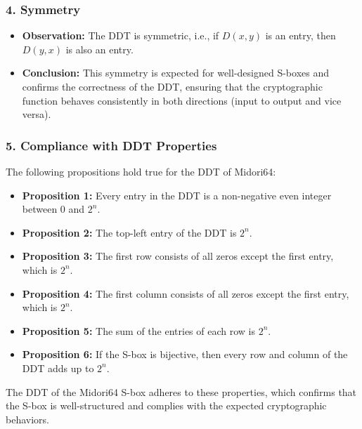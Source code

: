 \subsubsection*{4. Symmetry}
\begin{itemize}
	\item
	      \textbf{Observation:} The DDT is symmetric, i.e., if \( D(x, y) \) is an entry,
	      then \( D(y, x) \) is also an entry.
	\item
	      \textbf{Conclusion:} This symmetry is expected for well-designed S-boxes and
	      confirms the correctness of the DDT, ensuring that the cryptographic function
	      behaves consistently in both directions (input to output and vice versa).
\end{itemize}

\subsubsection*{5. Compliance with DDT Properties}
The following propositions hold true for the DDT of Midori64:
\begin{itemize}
	\item \textbf{Proposition 1:} Every entry in the DDT is a non-negative even
	      integer between 0 and \( 2^n \).
	\item \textbf{Proposition 2:} The top-left entry of the DDT is \( 2^n \).
	\item \textbf{Proposition 3:} The first row consists of all zeros except the
	      first entry, which is \( 2^n \).
	\item \textbf{Proposition 4:} The first column consists of all zeros except
	      the first entry, which is \( 2^n \).
	\item \textbf{Proposition 5:} The sum of the entries of each row is \( 2^n \).
	\item \textbf{Proposition 6:} If the S-box is bijective, then every row and
	      column of the DDT adds up to \( 2^n \).
\end{itemize}

The DDT of the Midori64 S-box adheres to these properties, which confirms that
the S-box is well-structured and complies with the expected cryptographic
behaviors.

